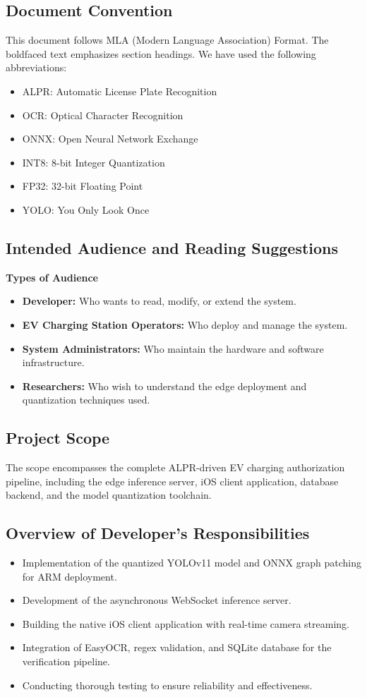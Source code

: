 \subsection{Document Convention}
This document follows MLA (Modern Language Association) Format. The boldfaced text emphasizes section headings. We have used the following abbreviations:
\begin{itemize}
    \item ALPR: Automatic License Plate Recognition
    \item OCR: Optical Character Recognition
    \item ONNX: Open Neural Network Exchange
    \item INT8: 8-bit Integer Quantization
    \item FP32: 32-bit Floating Point
    \item YOLO: You Only Look Once
\end{itemize}

\subsection{Intended Audience and Reading Suggestions}
\textbf{Types of Audience}
\begin{itemize}
    \item \textbf{Developer:} Who wants to read, modify, or extend the system.
    \item \textbf{EV Charging Station Operators:} Who deploy and manage the system.
    \item \textbf{System Administrators:} Who maintain the hardware and software infrastructure.
    \item \textbf{Researchers:} Who wish to understand the edge deployment and quantization techniques used.
\end{itemize}

\subsection{Project Scope}
The scope encompasses the complete ALPR-driven EV charging authorization pipeline, including the edge inference server, iOS client application, database backend, and the model quantization toolchain.

\subsection{Overview of Developer's Responsibilities}
\begin{itemize}
    \item Implementation of the quantized YOLOv11 model and ONNX graph patching for ARM deployment.
    \item Development of the asynchronous WebSocket inference server.
    \item Building the native iOS client application with real-time camera streaming.
    \item Integration of EasyOCR, regex validation, and SQLite database for the verification pipeline.
    \item Conducting thorough testing to ensure reliability and effectiveness.
\end{itemize}

